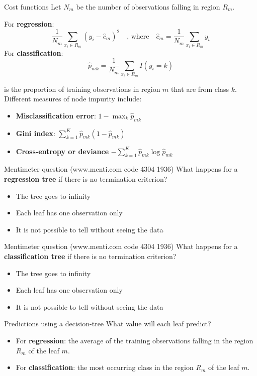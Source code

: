 \documentclass[notes]{beamer}          %
\begin{document}
\begin{frame}{Cost functions}
Let $N_m$ be the number of observations falling in region $R_m$.

For \textbf{regression}:
$$\dfrac{1}{N_m}\sum_{x_i\in R_m}(y_i-\hat c_m)^2  \quad \mbox{, where} \quad \hat c_m = \dfrac{1}{N_m}\sum_{x_i\in R_m}y_i$$
For \textbf{classification}:
\begin{equation*}
	\hat{p}_{mk}=\dfrac{1}{N_m}\sum_{x_i\in R_m}I(y_i=k)
\end{equation*}

is the proportion of training observations in region $m$ that are from class $k$. Different measures of node impurity include:
\begin{itemize}
\item  \textbf{Misclassification error}: $1-\max_k \hat{p}_{mk}$
\item  \textbf{Gini index}: $\sum_{k=1}^K\hat{p}_{mk}(1-\hat{p}_{mk})$
\item  \textbf{Cross-entropy or deviance} $-\sum_{k=1}^K\hat{p}_{mk}\log\hat{p}_{mk}$
\end{itemize}
\end{frame}

\begin{frame}{Mentimeter question (www.menti.com code 4304 1936)}
What happens for a \textbf{regression tree} if there is no termination criterion?
\begin{itemize}
\item The tree goes to infinity
\item Each leaf has one observation only
\item It is not possible to tell without seeing the data
\end{itemize}	
\end{frame}

\begin{frame}{Mentimeter question (www.menti.com code 4304 1936)}
What happens for a \textbf{classification tree} if there is no termination criterion?
\begin{itemize}
\item The tree goes to infinity
\item Each leaf has one observation only
\item It is not possible to tell without seeing the data
\end{itemize}	
\end{frame}



\begin{frame}{Predictions using a decision-tree}
What value will each leaf predict?
\begin{itemize}
	\item For \textbf{regression}: the average of the  training observations falling in the region $R_m$ of the leaf $m$.
		\item For \textbf{classification}: the most occurring class in the region $R_m$ of the leaf $m$.
\end{itemize}

\vspace{0.5cm}

\end{frame}
\end{document}
